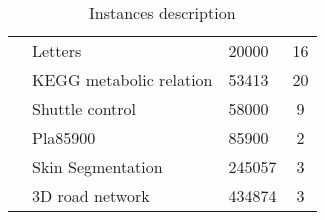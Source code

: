 \begin{table}[!h]
\begin{tabular}{@{}lllc@{}}
         & Letters                         & 20000                 & 16                 \\
         & KEGG metabolic relation         & 53413                 & 20                 \\
         & Shuttle control                 & 58000                 & 9                  \\
         & Pla85900                        & 85900                 & 2                  \\
         & Skin Segmentation               & 245057                & 3                  \\
         & 3D road network                 & 434874                & 3                  \\ \bottomrule
\end{tabular}
\caption{Instances description}
\label{instances}
\end{table}